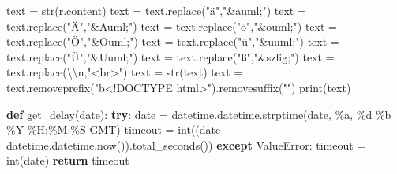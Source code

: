 \documentclass[
  letterpaper,
]{book}
\newenvironment{Shaded}{\begin{snugshade}}{\end{snugshade}}
\newcommand{\BuiltInTok}[1]{\textcolor[rgb]{0.00,0.23,0.31}{#1}}
\newcommand{\CharTok}[1]{\textcolor[rgb]{0.13,0.47,0.30}{#1}}
\newcommand{\ControlFlowTok}[1]{\textcolor[rgb]{0.00,0.23,0.31}{\textbf{#1}}}
\newcommand{\KeywordTok}[1]{\textcolor[rgb]{0.00,0.23,0.31}{\textbf{#1}}}
\newcommand{\NormalTok}[1]{\textcolor[rgb]{0.00,0.23,0.31}{#1}}
\newcommand{\OperatorTok}[1]{\textcolor[rgb]{0.37,0.37,0.37}{#1}}
\newcommand{\PreprocessorTok}[1]{\textcolor[rgb]{0.68,0.00,0.00}{#1}}
\newcommand{\SpecialCharTok}[1]{\textcolor[rgb]{0.37,0.37,0.37}{#1}}
\newcommand{\StringTok}[1]{\textcolor[rgb]{0.13,0.47,0.30}{#1}}
\begin{document}
\begin{Shaded}
\begin{Highlighting}[]
\NormalTok{        text }\OperatorTok{=} \BuiltInTok{str}\NormalTok{(r.content)}
\NormalTok{        text }\OperatorTok{=}\NormalTok{ text.replace(}\StringTok{"ä"}\NormalTok{,}\StringTok{"\&auml;"}\NormalTok{)}
\NormalTok{        text }\OperatorTok{=}\NormalTok{ text.replace(}\StringTok{"Ä"}\NormalTok{,}\StringTok{"\&Auml;"}\NormalTok{)}
\NormalTok{        text }\OperatorTok{=}\NormalTok{ text.replace(}\StringTok{"ö"}\NormalTok{,}\StringTok{"\&ouml;"}\NormalTok{)}
\NormalTok{        text }\OperatorTok{=}\NormalTok{ text.replace(}\StringTok{"Ö"}\NormalTok{,}\StringTok{"\&Ouml;"}\NormalTok{)}
\NormalTok{        text }\OperatorTok{=}\NormalTok{ text.replace(}\StringTok{"ü"}\NormalTok{,}\StringTok{"\&uuml;"}\NormalTok{)}
\NormalTok{        text }\OperatorTok{=}\NormalTok{ text.replace(}\StringTok{"Ü"}\NormalTok{,}\StringTok{"\&Uuml;"}\NormalTok{)}
\NormalTok{        text }\OperatorTok{=}\NormalTok{ text.replace(}\StringTok{"ß"}\NormalTok{,}\StringTok{"\&szlig;"}\NormalTok{)}
\NormalTok{        text }\OperatorTok{=}\NormalTok{ text.replace(}\StringTok{\textquotesingle{}}\CharTok{\textbackslash{}\textbackslash{}}\StringTok{n\textquotesingle{}}\NormalTok{,}\StringTok{"\textless{}br\textgreater{}"}\NormalTok{)}
\NormalTok{        text }\OperatorTok{=} \BuiltInTok{str}\NormalTok{(text)}
\NormalTok{        text }\OperatorTok{=}\NormalTok{ text.removeprefix(}\StringTok{"b\textquotesingle{}\textless{}!DOCTYPE html\textgreater{}"}\NormalTok{).removesuffix(}\StringTok{"\textquotesingle{}"}\NormalTok{)}
        \BuiltInTok{print}\NormalTok{(text)}

\KeywordTok{def}\NormalTok{ get\_delay(date):}
    \ControlFlowTok{try}\NormalTok{:}
\NormalTok{        date }\OperatorTok{=}\NormalTok{ datetime.datetime.strptime(date, }\StringTok{\textquotesingle{}\%a, }\SpecialCharTok{\%d}\StringTok{ \%b \%Y \%H:\%M:\%S GMT\textquotesingle{}}\NormalTok{)}
\NormalTok{        timeout }\OperatorTok{=} \BuiltInTok{int}\NormalTok{((date }\OperatorTok{{-}}\NormalTok{ datetime.datetime.now()).total\_seconds())}
    \ControlFlowTok{except} \PreprocessorTok{ValueError}\NormalTok{:}
\NormalTok{        timeout }\OperatorTok{=} \BuiltInTok{int}\NormalTok{(date)}
    \ControlFlowTok{return}\NormalTok{ timeout}


\end{Highlighting}
\end{Shaded}
\end{document}
